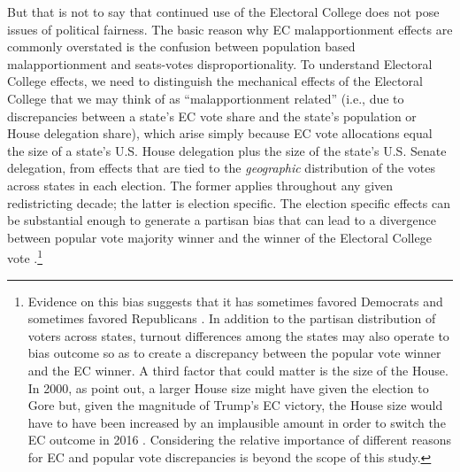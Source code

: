 But that is not to say that continued use of the Electoral College does not pose issues of political fairness. The basic reason why EC malapportionment effects are commonly overstated is the confusion between population based malapportionment and seats-votes disproportionality. To understand Electoral College effects, we need to distinguish the mechanical effects of the Electoral College that we may think of as ``malapportionment related'' (i.e., due to discrepancies between a state’s EC vote share and the state’s population or House delegation share), which arise simply because EC vote allocations equal the size of a state’s U.S. House delegation plus the size of the state’s U.S. Senate delegation, from effects that are tied to the \textit{geographic} distribution of the votes across states in each election. The former applies throughout any given redistricting decade; the latter is election specific. The election specific effects can be substantial enough to generate a partisan bias that can lead to a divergence between popular vote majority winner and the winner of the Electoral College vote \citep{CervasGrofman2019_SSQ}.\footnote{Evidence on this bias suggests that it has sometimes favored Democrats and sometimes favored Republicans \citep{Grofman_et_al_1997__IntedgratedPerspective_ES, PattieJohnson2014, Zingher2016_bias_swingratio_JEPP}. In addition to the partisan distribution of voters across states, turnout differences among the states may also operate to bias outcome so as to create a discrepancy between the popular vote winner and the EC winner. A third factor that could matter is the size of the House. In 2000, as \citet{Neubauer2003} point out, a larger House size might have given the election to Gore but, given the magnitude of Trump’s EC victory, the House size would have to have been increased by an implausible amount in order to switch the EC outcome in 2016 \citep{CervasGrofman2019_SSQ}. Considering the relative importance of different reasons for EC and popular vote discrepancies is beyond the scope of this study.}

  

